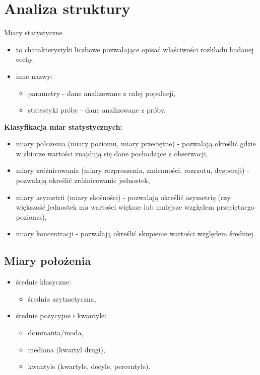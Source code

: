 \documentclass[
  polish,
  letterpaper,
  DIV=11,
  numbers=noendperiod]{scrreprt}
\providecommand{\tightlist}{%
  \setlength{\itemsep}{0pt}\setlength{\parskip}{0pt}}
\begin{document}
\chapter{Analiza struktury}\label{analiza-struktury}

Miary statystyczne

\begin{itemize}
\tightlist
\item
  to charakterystyki liczbowe pozwalające opisać właściwości rozkładu
  badanej cechy.
\item
  inne nazwy:

  \begin{itemize}
  \tightlist
  \item
    parametry - dane analizowane z całej populacji,
  \item
    statystyki próby - dane analizowane z próby.
  \end{itemize}
\end{itemize}

\textbf{Klasyfikacja miar statystycznych:}

\begin{itemize}
\tightlist
\item
  miary położenia (miary poziomu, miary przeciętne) - pozwalają określić
  gdzie w zbiorze wartości znajdują się dane pochodzące z obserwacji,
\item
  miary zróżnicowania (miary rozproszenia, zmienności, rozrzutu,
  dyspersji) - pozwalają określić zróżnicowanie jednostek,
\item
  miary asymetrii (miary skośności) - pozwalają określić asymetrię (czy
  większość jednostek ma wartości większe lub mniejsze względem
  przeciętnego poziomu),
\item
  miary koncentracji - pozwalają określić skupienie wartości względem
  średniej.
\end{itemize}

\section{Miary położenia}\label{miary-poux142oux17cenia}

\begin{itemize}
\tightlist
\item
  średnie klasyczne:

  \begin{itemize}
  \tightlist
  \item
    średnia arytmetyczna,
  \end{itemize}
\item
  średnie pozycyjne i kwantyle:

  \begin{itemize}
  \tightlist
  \item
    dominanta/moda,
  \item
    mediana (kwartyl drugi),
  \item
    kwantyle (kwartyle, decyle, percentyle).
  \end{itemize}
\end{itemize}
\end{document}
